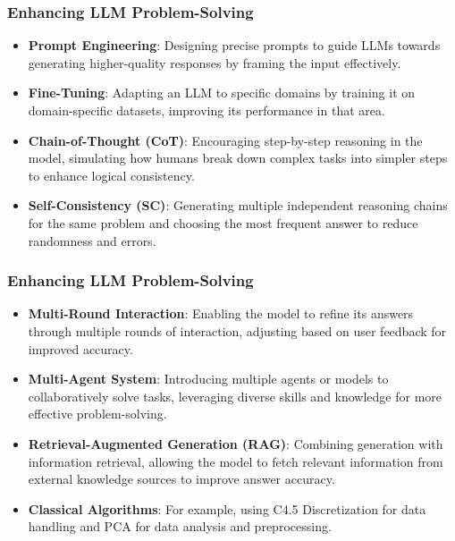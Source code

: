 \documentclass{beamer}
\begin{document}
\begin{frame}
    \frametitle{Enhancing LLM Problem-Solving}
    \begin{itemize}
        \item \textbf{Prompt Engineering}: Designing precise prompts to guide LLMs towards generating higher-quality responses by framing the input effectively.
        \item \textbf{Fine-Tuning}: Adapting an LLM to specific domains by training it on domain-specific datasets, improving its performance in that area.
        \item \textbf{Chain-of-Thought (CoT)}: Encouraging step-by-step reasoning in the model, simulating how humans break down complex tasks into simpler steps to enhance logical consistency.
        \item \textbf{Self-Consistency (SC)}: Generating multiple independent reasoning chains for the same problem and choosing the most frequent answer to reduce randomness and errors.
    \end{itemize}
\end{frame}

\begin{frame}
    \frametitle{Enhancing LLM Problem-Solving}
    \begin{itemize}
        \item \textbf{Multi-Round Interaction}: Enabling the model to refine its answers through multiple rounds of interaction, adjusting based on user feedback for improved accuracy.
        \item \textbf{Multi-Agent System}: Introducing multiple agents or models to collaboratively solve tasks, leveraging diverse skills and knowledge for more effective problem-solving.
        \item \textbf{Retrieval-Augmented Generation (RAG)}: Combining generation with information retrieval, allowing the model to fetch relevant information from external knowledge sources to improve answer accuracy.
        \item \textbf{Classical Algorithms}: For example, using C4.5 Discretization for data handling and PCA for data analysis and preprocessing.
    \end{itemize}
\end{frame}
\end{document}
